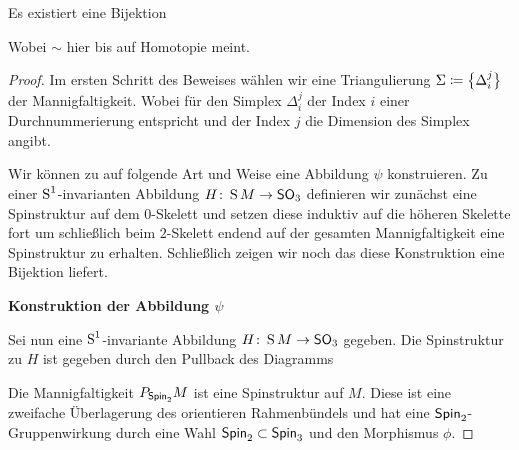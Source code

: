 \begin{Satz}
	Es existiert eine Bijektion
	\begin{center}
	\end{center}
	Wobei $ \sim $ hier bis auf Homotopie meint.
	\begin{proof}
          Im ersten Schritt des Beweises wählen wir eine
          Triangulierung $\Sigma \coloneqq \sset{ \Delta_i^j}$ der
          Mannigfaltigkeit. Wobei für den Simplex $\Delta_i^j$ der
          Index $i$ einer Durchnummerierung entspricht und der Index
          $j$ die Dimension des Simplex angibt.  
		
          Wir können zu auf folgende Art und Weise eine Abbildung
          $\psi$ konstruieren.  Zu einer $\S^1$-invarianten Abbildung
          $\abb{H}{\S M}{\so_3}$ definieren wir zunächst eine
          Spinstruktur auf dem $0$-Skelett und setzen diese induktiv
          auf die höheren Skelette fort um schließlich beim
          $2$-Skelett endend auf der gesamten Mannigfaltigkeit eine
          Spinstruktur zu erhalten. Schließlich zeigen wir noch das
          diese Konstruktion eine Bijektion liefert.
		
          \textbf{Konstruktion der Abbildung $\psi$}
		
          Sei nun eine $\S^1$-invariante Abbildung
          $\abb{H}{\S M}{\so_3}$ gegeben. Die Spinstruktur zu $ H $
          ist gegeben durch den Pullback des Diagramms $  $
              \begin{center}
            \end{center}
          Die Mannigfaltigkeit $ \Ph{\spin_2}{M} $ ist eine Spinstruktur
          auf $ M $. Diese ist eine zweifache Überlagerung des orientieren
          Rahmenbündels und hat eine $ \spin_2 $-Gruppenwirkung durch
          eine Wahl $ \spin_2\subset\spin_3 $ und den Morphismus $ \phi $.
          

\end{proof}
\end{Satz}
